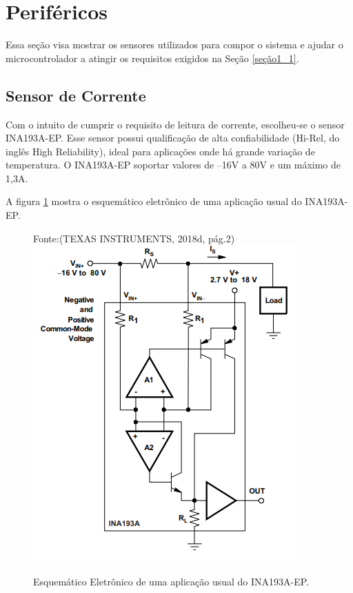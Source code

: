 \section{Periféricos}

	Essa seção visa mostrar os sensores utilizados para compor o sistema e ajudar o microcontrolador a atingir os requisitos exigidos na Seção \ref{seção1_1}.

\subsection{Sensor de Corrente}

Com o intuito de cumprir o requisito de leitura de corrente, escolheu-se o sensor INA193A-EP. Esse sensor possui qualificação de alta confiabilidade (Hi-Rel, do inglês High Reliability), ideal para aplicações onde há grande variação de temperatura. O INA193A-EP soportar valores de –16V a 80V  e um máximo de 1,3A.

A figura \ref{fig20} mostra o esquemático eletrônico de uma aplicação usual do INA193A-EP.

\newpage

\begin{figure}[h]
	\centering
    Fonte:(TEXAS INSTRUMENTS, 2018d, pág.2)\linebreak
	\includegraphics[keepaspectratio=true,scale=0.6]{figuras/currentSensor.PNG}
	\caption{Esquemático Eletrônico de uma aplicação usual do INA193A-EP.}
	\label{fig20}
\end{figure}

